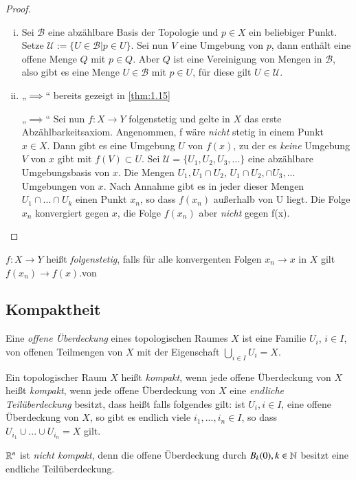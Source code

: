 \documentclass[a4paper,10pt]{scrartcl}
\begin{document}
\begin{proof}
 \begin{enumerate}[(i)]
  \item Sei $\mathcal B$ eine abzählbare Basis der Topologie und $p\in X$ ein beliebiger Punkt. Setze $\mathcal U:=\{U\in \mathcal{B} |p\in U\}$. Sei nun $V$ eine Umgebung von $p$, dann enthält eine offene Menge $Q$ mit $p\in Q$. Aber $Q$ ist eine Vereinigung von Mengen in $\mathcal B$, also gibt es eine Menge $U\in \mathcal B$ mit $p\in U$, für diese gilt $U\in \mathcal U$.
\item \begin{seg}{„$\implies$“} bereits gezeigt in \ref{thm:1.15} \end{seg}
\begin{seg}{„$\implies$“} Sei nun $f:X\to Y$ folgenstetig und gelte in $X$ das erste Abzählbarkeitsaxiom. Angenommen, f wäre \emph{nicht} stetig in einem Punkt $x\in X$. Dann gibt es eine Umgebung $U$ von $f(x)$, zu der es \emph{keine} Umgebung $V$ von $x$ gibt mit $f(V)\subset U$.
 Sei $\mathcal U=\{U_1,U_2,U_3,...\}$ eine abzählbare Umgebungsbasis von $x$. 
Die Mengen $U_1, U_1\cap U_2$, $U_1\cap U_2,\cap U_3,...$ Umgebungen von $x$. 
Nach Annahme gibt es in jeder dieser Mengen $U_1\cap...\cap U_k$ einen Punkt $x_n$, so dass $f(x_n)$ außerhalb 
von U liegt. Die Folge $x_n$ konvergiert gegen $x$, die Folge $f(x_n)$ aber \emph{nicht} gegen f(x).
\end{seg}
\end{enumerate}
\end{proof}
\begin{note}
 $f: X\to Y$ heißt \emph{folgenstetig}, falls für alle konvergenten Folgen $x_n\to x$ in $X$ gilt $f(x_n)\to f(x)$.von 
\end{note}
\subsection{Kompaktheit}
\begin{df}\label{thm:6.1}
 Eine \emph{offene Überdeckung} eines topologischen Raumes $X$ ist eine Familie $U_i$, $i\in I$, von offenen Teilmengen von $X$ mit der Eigenschaft $\bigcup_{i\in I} U_i=X$.
\end{df}
\begin{df}\label{thm:6.2}
 Ein topologischer Raum $X$ heißt \emph{kompakt}, wenn jede offene Überdeckung von $X$ heißt \emph{kompakt}, wenn jede offene Überdeckung von $X$ eine \emph{endliche Teilüberdeckung} besitzt, dass heißt falls folgendes gilt: ist $U_i, i\in I$, eine offene Überdeckung von $X$, so gibt es endlich viele $i_1, ...,i_n\in I$, so dass $U_{i_1}\cup ...\cup U_{i_n}=X$ gilt.
\end{df}
\begin{ex*}
 $\mathbb{R}^n$ ist \emph{nicht kompakt}, denn die offene Überdeckung durch $B_k(0),k\in \mathbb{N}$ besitzt eine endliche Teilüberdeckung.
\end{ex*}
\end{document}
